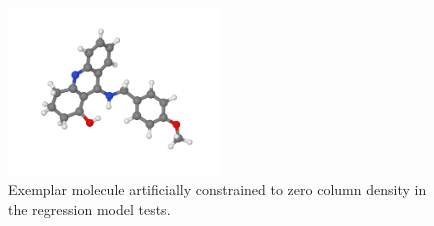 \documentclass[twocolumn]{aastex63}
\begin{document}
\begin{figure}
    \centering
    \includegraphics[width=0.5\textwidth]{excluded_molecule.pov.png}
    \caption{Exemplar molecule artificially constrained to zero column density in the regression model tests.}
    \label{fig:zerocolumn_struct}
\end{figure}
\end{document}
